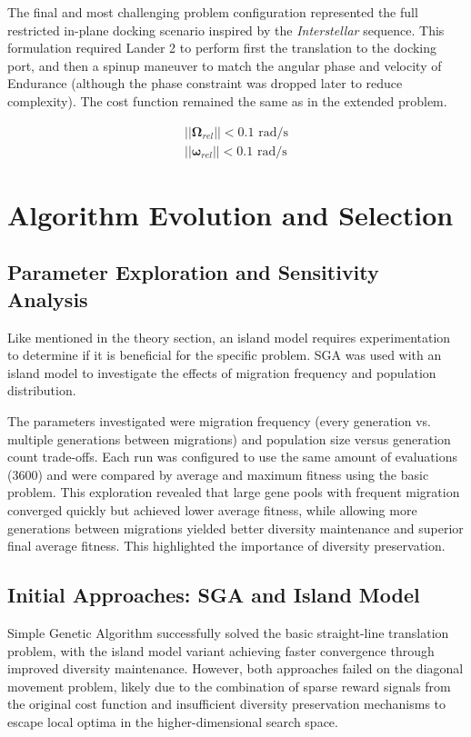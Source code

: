 The final and most challenging problem configuration represented the full
restricted in-plane docking scenario inspired by the \textit{Interstellar}
sequence. This formulation required Lander 2 to perform first the translation
to the docking port, and then a spinup maneuver to match the angular phase and
velocity of Endurance (although the phase constraint was dropped later to
reduce complexity). The cost function remained the same as in the extended
problem.

\begin{align}
    ||\boldsymbol{\Omega}_{rel}|| < 0.1 \text{ rad/s} \\
    ||\boldsymbol{\omega}_{rel}|| < 0.1 \text{ rad/s}
\end{align}

\section{Algorithm Evolution and Selection}
\subsection{Parameter Exploration and Sensitivity Analysis}

Like mentioned in the theory section, an island model requires experimentation to determine if it is beneficial for the specific problem. SGA was used with an island model to investigate the effects of migration frequency and population distribution.

The parameters investigated were migration frequency (every generation vs. multiple generations between migrations) and population size versus generation count trade-offs. Each run was configured to use the same amount of evaluations (3600) and were compared by average and maximum fitness using the basic problem. This exploration revealed that large gene pools with frequent migration converged quickly but achieved lower average fitness, while allowing more generations between migrations yielded better diversity maintenance and superior final average fitness. This highlighted the importance of diversity preservation.

\subsection{Initial Approaches: SGA and Island Model}

Simple Genetic Algorithm successfully solved the basic straight-line translation problem, with the island model variant achieving faster convergence through improved diversity maintenance. However, both approaches failed on the diagonal movement problem, likely due to the combination of sparse reward signals from the original cost function and insufficient diversity preservation mechanisms to escape local optima in the higher-dimensional search space.

